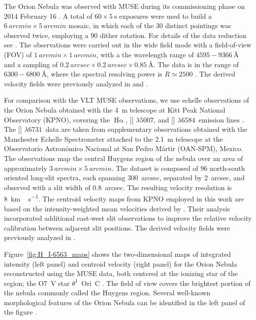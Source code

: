 \documentclass[fleqn,usenatbib, useAMS, a4paper]{mnras}
\newcommand\ha{\ensuremath{\text{H}\upalpha}}
\newcommand\Wav[1]{\ensuremath{\lambda #1}}
\newcommand\halpha{\ha}
\newcommand\n{[\ion{N}{II}] \Wav{6584}}
\newcommand\oiii{[\ion{O}{III}] \Wav{5007}}
\newcommand\sii{[\ion{S}{II}] \Wav{6731}}
\begin{document}
The Orion Nebula was observed with MUSE during its commissioning phase on 2014 February 16 \citep{2014Msngr.157...13B}.
A total of \(60 \times 5 \ \text{s}\) exposures were used to build a \(\qty{6}{arcmin} \times \qty{5}{arcmin}\) mosaic, in which each of the 30 distinct pointings was observed twice, employing a 90\textdegree{} dither rotation.
For details of the data reduction see \citet{2015A&A...582A.114W}.
The observations were carried out in the wide field mode with a field-of-view (FOV) of \(\qty{1}{arcmin} \times \qty{1}{arcmin}\), with a the wavelength range of \(4595-  \qty{9366}{\angstrom} \) and a sampling of \(\qty{0.2}{arcsec} \times \qty{0.2}{arcsec} \times \qty{0.85}{\angstrom}  \). 
The data is in the range of \(6300 - \qty{6800}{\angstrom}\), where the spectral resolving power is \(R \simeq 2500\) \citep{2021MNRAS.502.4597H}.
The derived velocity fields were previously analyzed in \citet{2016MNRAS.455.4057M} and \citet{2019MNRAS.483..704A}.

For comparison with the VLT MUSE observations, we use echelle observations of the Orion Nebula obtained with the \qty{4}{m} telescope at Kitt Peak National Observatory (KPNO), covering the \halpha, \oiii, and \n\ emission lines \citep{Doi:2004a}. 
The \sii\ data are taken from supplementary observations obtained with the Manchester Echelle Spectrometer attached to the \qty{2.1}{m} telescope at the Observatorio Astronómico Nacional at San Pedro Mártir (OAN-SPM), Mexico.
The observations map the central Huygens region of the nebula over an area of approximately \(\qty{3}{arcmin} \times \qty{5}{arcmin}\). 
The dataset is composed of 96 north-south oriented long-slit spectra, each spanning \qty{300}{arcsec}, separated by \qty{2}{arcsec}, and observed with a slit width of \qty{0.8}{arcsec}. 
The resulting velocity resolution is \qty{8}{km\,s^{-1}}. 
The centroid velocity maps from KPNO employed in this work are based on the intensity-weighted mean velocities derived by \citet{Garcia-Diaz:2008a}. 
Their analysis incorporated additional east-west slit observations to improve the relative velocity calibration between adjacent slit positions.
The derived velocity fields were previously analyzed in \citet{arthur2016turbulence}.

Figure~\ref{fig:H_I-6563_maps} shows the two-dimensional maps of integrated intensity (left panel) and centroid velocity (right panel) for the Orion Nebula reconstructed using the MUSE data, both centered at the ionizing star of the region; the O7~V star $\theta^1$~Ori~C \citep{2006A&A...448..351S}. 
The field of view covers the brightest portion of the nebula commonly called the Huygens region.
Several well-known morphological features of the Orion Nebula can be identified in the left panel of the figure \citep{2009AJ....137..367O}. 
\end{document}
